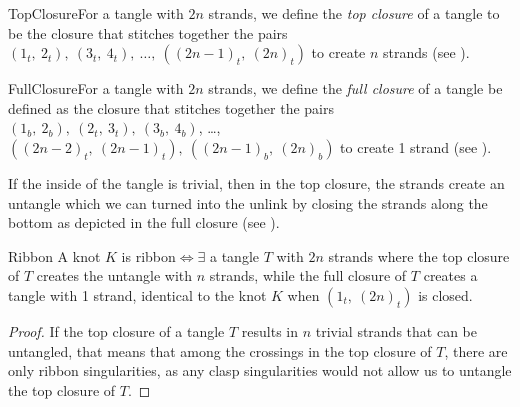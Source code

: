 \begin{paper}


\begin{paperdef}{TopClosure}{For a tangle with $2n$ strands, we define the
\textit{top closure} of a tangle to be the closure that stitches together the
pairs $(1_t,~2_t),~(3_t,~4_t),~\dots,~((2n-1)_t,~(2n)_t)$ to create
$n$ strands (see \figTop).}\end{paperdef}



\begin{paperdef}{FullClosure}{For a tangle with $2n$ strands, we define the
\textit{full closure} of a tangle be defined as the closure that stitches
together the pairs $(1_b,~2_b),~(2_t,~3_t),~(3_b,~4_b)$, \dots,
$((2n-2)_t,~(2n-1)_t),~((2n-1)_b,~(2n)_b)$ to create 1 strand (see
\figFull).}\end{paperdef}

If the inside of the tangle is trivial, then in the top closure, the strands
create an untangle which we can turned into the unlink by closing the strands
along the bottom as depicted in the full closure (see \figFull).

\begin{paperthm}{Ribbon}
A knot $K$ is ribbon$\iff\exists$ a tangle $T$ with $2n$ strands where the
top closure of $T$ creates the untangle with $n$ strands, while the
full closure of $T$ creates a tangle with 1 strand, identical to the knot $K$
when $(1_t,~(2n)_t)$ is closed.
\end{paperthm}
\begin{proof}
If the top closure of a tangle $T$ results in $n$ trivial strands that can be
untangled, that means that among the crossings in the top closure of $T$, there
are only ribbon singularities, as any clasp singularities would not allow us to
untangle the top closure of $T$.


\end{proof}
\end{paper}

